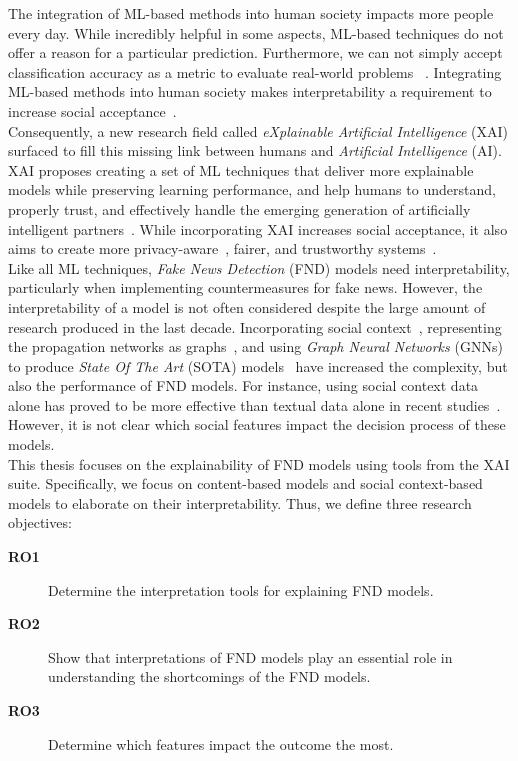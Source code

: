The integration of ML-based methods into human society impacts more people every day. While incredibly helpful in some aspects,
ML-based techniques do not offer a reason for a particular prediction. Furthermore, we can not simply accept classification accuracy
as a metric to evaluate real-world problems ~\parencite{TowardsARigorousScienceML_Velez}. Integrating ML-based methods into human society
makes interpretability a requirement to increase social acceptance~\parencite{InterpretableMachineLearning_Molnar}.\\
Consequently, a new research field called \emph{eXplainable Artificial Intelligence} (XAI) surfaced to fill this missing link between humans and
\emph{Artificial Intelligence} (AI). XAI proposes creating a set of ML techniques that deliver more explainable models while preserving learning performance, and help humans to understand, properly trust, and effectively handle the emerging generation of artificially intelligent partners~\parencite{XAI_Gunning}. While incorporating XAI increases social acceptance, it also aims to create more privacy-aware~\parencite{SlaveToTheAlgorithm_EdwardsVeale}, fairer, and trustworthy systems~\parencite{TheMythosOfModelInterpretability_Lipton}.\\
Like all ML techniques, \emph{Fake News Detection} (FND) models need interpretability, particularly when implementing countermeasures for fake
news. However, the interpretability of a model is not often considered despite the large amount of research produced in the last decade.
Incorporating social context~\parencite{FakeNewsNet_Shu}, representing the propagation networks as graphs~\parencite{UPFD_Dataset_Shu},
and using \emph{Graph Neural Networks} (GNNs) to produce \emph{State Of The Art} (SOTA) models~\parencite{FakeNewsDetectionUsingGeometricDeepLearning_Monti} have increased the complexity, but also the performance of FND models.
For instance, using social context data alone has proved to be more effective than textual data alone in recent studies~\parencite{UPFD_Dataset_Shu}. However, it is not clear which social features impact the decision process of these models.\\
This thesis focuses on the explainability of FND models using tools from the XAI suite. Specifically, we focus on content-based models and social context-based models to elaborate on their interpretability. Thus, we define three research objectives:
\begin{description}
    \item[\textbf{RO1}] Determine the interpretation tools for explaining FND models.
    \item[\textbf{RO2}] Show that interpretations of FND models play an essential role in understanding the shortcomings of the FND models.
    \item[\textbf{RO3}] Determine which features impact the outcome the most.
\end{description}
